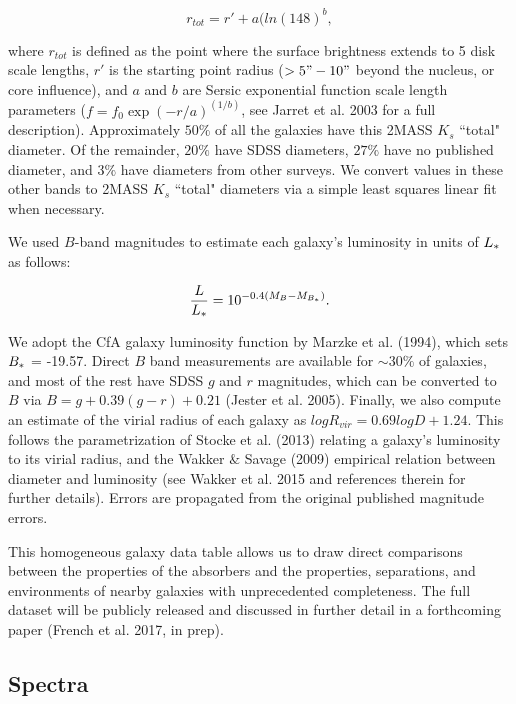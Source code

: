 \documentclass[twocolumn,tighten]{aastex6}
\begin{document}
\begin{equation}
r_{tot} = r' + a(ln(148)^b,
\end{equation}

\noindent where $r_{tot}$ is defined as the point where the surface brightness extends to 5 disk scale lengths, $r'$ is the starting point radius ($>5" - 10"$ beyond the nucleus, or core influence), and $a$ and $b$ are Sersic exponential function scale length parameters ($f = f_0 \exp{(-r/a)}^{(1/b)}$, see Jarret et al. 2003 for a full description). Approximately $50\%$ of all the galaxies have this 2MASS $K_s$ ``total" diameter. Of the remainder, $20\%$ have SDSS diameters, $27\%$ have no published diameter, and $3\%$ have diameters from other surveys. We convert values in these other bands to 2MASS $K_s$ ``total" diameters via a simple least squares linear fit when necessary.

We used $B$-band magnitudes to estimate each galaxy's luminosity in units of $L_{\**}$ as follows:

\begin{equation}
	\frac{L}{L_{\**}} = 10^{-0.4 (M_{B} - M_{B_{\**}})}.
\end{equation}

We adopt the CfA galaxy luminosity function by Marzke et al. (1994), which sets $B_{\**} $ = -19.57. Direct $B$ band measurements are available for $\sim 30\%$ of galaxies, and most of the rest have SDSS $g$ and $r$ magnitudes, which can be converted to $B$ via $B = g + 0.39 (g-r) + 0.21$ (Jester et al. 2005). Finally, we also compute an estimate of the virial radius of each galaxy as $log R_{vir} = 0.69 log D + 1.24$. This follows the parametrization of Stocke et al. (2013) relating a galaxy's luminosity to its virial radius, and the Wakker $\&$ Savage (2009) empirical relation between diameter and luminosity (see Wakker et al. 2015 and references therein for further details). Errors are propagated from the original published magnitude errors.

This homogeneous galaxy data table allows us to draw direct comparisons between the properties of the absorbers and the properties, separations, and environments of nearby galaxies with unprecedented completeness. The full dataset will be publicly released and discussed in further detail in a forthcoming paper (French et al. 2017, in prep).


\subsection{Spectra}
\end{document}

